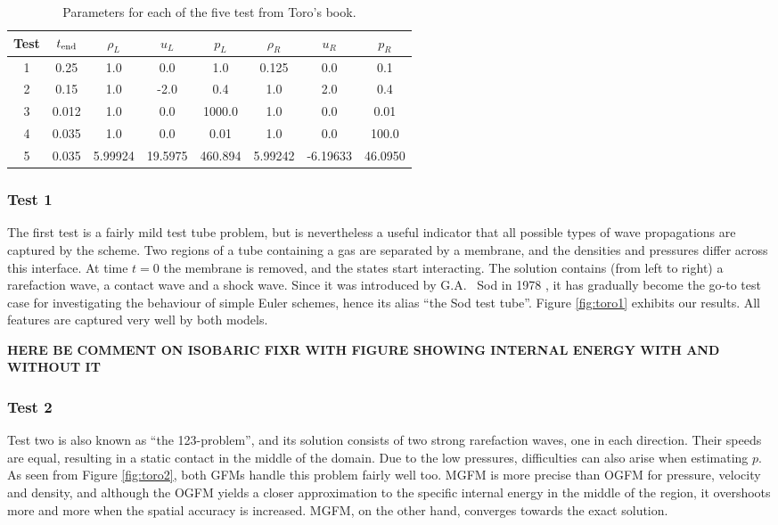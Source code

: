 \documentclass[final,3p,twocolumn]{elsarticle}
\begin{document}
\begin{table*}[htb]
    \centering
    \begin{tabular}{cccccccc}
        \hline 
        Test & $t_{\rm end}$ & $\rho_L$ & $u_L$ & $p_L$ & $\rho_R$ & $u_R$ & $p_R$ \\
        \hline 
        1 & 0.25 & 1.0 & 0.0 & 1.0 & 0.125 & 0.0 & 0.1 \\
        2 & 0.15 & 1.0 & -2.0 & 0.4 & 1.0 & 2.0 & 0.4 \\
        3 & 0.012 & 1.0 & 0.0 & 1000.0 & 1.0 & 0.0 & 0.01 \\
        4 & 0.035 & 1.0 & 0.0 & 0.01 & 1.0 & 0.0 & 100.0 \\
        5 & 0.035 & 5.99924 & 19.5975 & 460.894 & 5.99242 & -6.19633 & 46.0950 \\
        \hline
    \end{tabular}
    \caption{Parameters for each of the five test from Toro's book.}
    \label{tab:toro}
\end{table*}

\subsubsection{Test 1}

The first test is a fairly mild test tube problem, but is nevertheless a useful
indicator that all possible types of wave propagations are captured by the
scheme. Two regions of a tube containing a gas are separated by a membrane, and
the densities and pressures differ across this interface. At time $t=0$ the
membrane is removed, and the states start interacting. The solution contains
(from left to right) a rarefaction wave, a contact wave and a shock wave. Since
it was introduced by G.A.~ Sod in 1978 \cite{sod1978survey}, it has gradually
become the go-to test case for investigating the behaviour of simple Euler
schemes, hence its alias ``the Sod test tube''. Figure
\ref{fig:toro1} exhibits our results. All features are captured very well by
both models. 

{\bf \huge HERE BE COMMENT ON ISOBARIC FIXR WITH FIGURE SHOWING INTERNAL ENERGY
WITH AND WITHOUT IT}

\subsubsection{Test 2}

Test two is also known as ``the 123-problem'', and its solution consists of two
strong rarefaction waves, one in each direction. Their speeds are equal,
resulting in a static contact in the middle of the domain. Due to the low
pressures, difficulties can also arise when estimating $p$. As seen from
Figure \ref{fig:toro2}, both GFMs handle this problem fairly well too. MGFM
is more precise than OGFM for pressure, velocity and density, and although the
OGFM yields a closer approximation to the specific internal energy in the
middle of the region, it overshoots more and more when the spatial accuracy is
increased. MGFM, on the other hand, converges towards the exact solution. 
\end{document}
